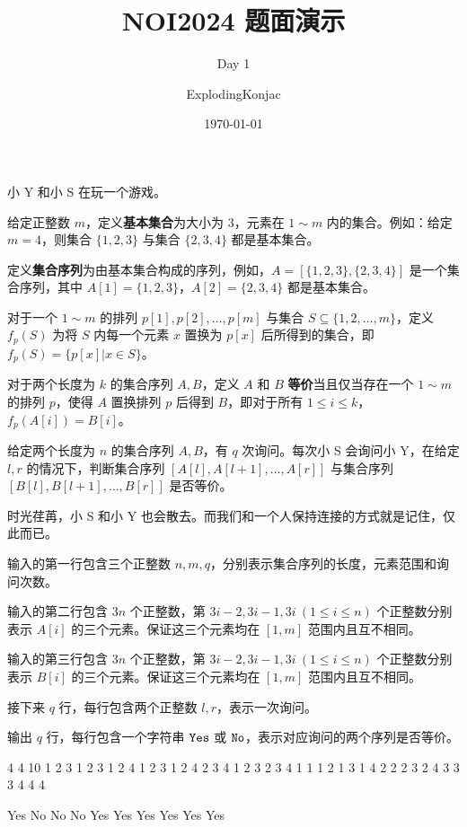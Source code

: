 \documentclass{oicontest-v2}
\title{NOI2024 题面演示}
\subtitle{Day 1}
\author{ExplodingKonjac}
\date{\today}
\begin{document}
\oictitlepage

\oicnextproblem %

\oicstatement

小 Y 和小 S 在玩一个游戏。

给定正整数 $m$，定义\textbf{基本集合}为大小为 $3$，元素在 $1\sim m$ 内的集合。例如：给定 $m=4$，则集合 $\{1,2,3\}$ 与集合 $\{2,3,4\}$ 都是基本集合。

定义\textbf{集合序列}为由基本集合构成的序列，例如，$A=[\{1,2,3\},\{2,3,4\}]$ 是一个集合序列，其中 $A[1]=\{1,2,3\}$，$A[2]=\{2,3,4\}$ 都是基本集合。

对于一个 $1\sim m$ 的排列 $p[1],p[2],\dots,p[m]$ 与集合 $S\subseteq \{1,2,\dots,m\}$，定义 $f_p(S)$ 为将 $S$ 内每一个元素 $x$ 置换为 $p[x]$ 后所得到的集合，即 $f_p(S)=\{p[x]|x\in S\}$。

对于两个长度为 $k$ 的集合序列 $A,B$，定义 $A$ 和 $B$ \textbf{等价}当且仅当存在一个 $1\sim m$ 的排列 $p$，使得 $A$ 置换排列 $p$ 后得到 $B$，即对于所有 $1\leq i\leq k$，$f_p(A[i])=B[i]$。

给定两个长度为 $n$ 的集合序列 $A,B$，有 $q$ 次询问。每次小 S 会询问小 Y，在给定 $l,r$ 的情况下，判断集合序列 $[A[l],A[l+1],\dots,A[r]]$ 与集合序列 $[B[l],B[l+1],\dots,B[r]]$ 是否等价。

时光荏苒，小 S 和小 Y 也会散去。而我们和一个人保持连接的方式就是记住，仅此而已。

\oicinputformat

输入的第一行包含三个正整数 $n,m,q$，分别表示集合序列的长度，元素范围和询问次数。

输入的第二行包含 $3n$ 个正整数，第 $3i-2,3i-1,3i\ (1\leq i\leq n)$ 个正整数分别表示 $A[i]$ 的三个元素。保证这三个元素均在 $[1,m]$ 范围内且互不相同。

输入的第三行包含 $3n$ 个正整数，第 $3i-2,3i-1,3i\ (1\leq i\leq n)$ 个正整数分别表示 $B[i]$ 的三个元素。保证这三个元素均在 $[1,m]$ 范围内且互不相同。

接下来 $q$ 行，每行包含两个正整数 $l,r$，表示一次询问。

\oicoutputformat

输出 $q$ 行，每行包含一个字符串 $\tt{Yes}$ 或 $\tt{No}$，表示对应询问的两个序列是否等价。

\begin{oicsample}
4 4 10
1 2 3 1 2 3 1 2 4 1 2 3
1 2 4 2 3 4 1 2 3 2 3 4
1 1
1 2
1 3
1 4
2 2
2 3
2 4
3 3
3 4
4 4
\end{oicsample}

\begin{oicsample}
Yes
No
No
No
Yes
Yes
Yes
Yes
Yes
Yes
\end{oicsample}
\end{document}
